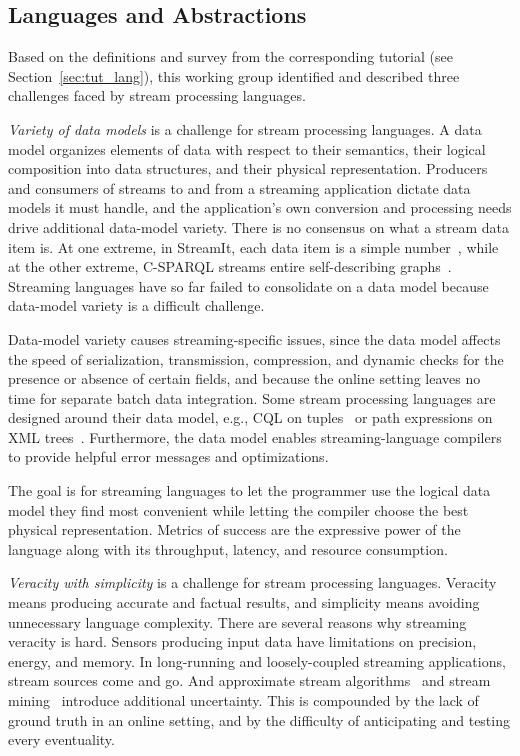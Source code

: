 \subsection{Languages and Abstractions}\label{sec:wg_lang}

Based on the definitions and survey from the corresponding tutorial
(see Section~\ref{sec:tut_lang}), this working group identified and
described three challenges faced by stream processing languages.

\emph{Variety of data models} is a challenge for stream processing
languages. A data model organizes elements of data with respect to
their semantics, their logical composition into data structures, and
their physical representation. Producers and consumers of streams to
and from a streaming application dictate data models it must handle,
and the application's own conversion and processing needs drive
additional data-model variety.  There is no consensus on what a stream
data item is. At one extreme, in StreamIt, each data item is a simple
number~\cite{thies_et_al_2002}, while at the other extreme, C-SPARQL
streams entire self-describing graphs~\cite{barbieri_et_al_2009}.
Streaming languages have so far failed to consolidate on a data model
because data-model variety is a difficult challenge.

Data-model variety causes streaming-specific issues, since the data
model affects the speed of serialization, transmission, compression,
and dynamic checks for the presence or absence of certain fields, and
because the online setting leaves no time for separate batch data
integration. Some stream processing languages are designed around
their data model, e.g., CQL on tuples~\cite{arasu_babu_widom_2006} or
path expressions on XML trees~\cite{diao_et_al_2002}. Furthermore, the
data model enables streaming-language compilers to provide helpful
error messages and optimizations.

The goal is for streaming languages to let the programmer use the
logical data model they find most convenient while letting the
compiler choose the best physical representation. Metrics of success
are the expressive power of the language along with its throughput,
latency, and resource consumption.

\emph{Veracity with simplicity} is a challenge for stream processing
languages. Veracity means producing accurate and factual results, and
simplicity means avoiding unnecessary language complexity. There are
several reasons why streaming veracity is hard. Sensors producing
input data have limitations on precision, energy, and memory. In
long-running and loosely-coupled streaming applications, stream
sources come and go. And approximate stream
algorithms~\cite{babcock_et_al_2002} and stream
mining~\cite{gaber_zaslavsky_krishnaswamy_2005} introduce additional
uncertainty. This is compounded by the lack of ground truth in an
online setting, and by the difficulty of anticipating and testing
every eventuality.

